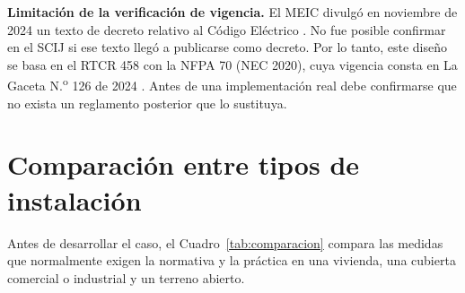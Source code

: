 \documentclass[12pt]{article}
\begin{document}
\textbf{Limitación de la verificación de vigencia.} El MEIC divulgó en noviembre de 2024 un texto de decreto relativo al Código Eléctrico \cite{meic2024}. No fue posible confirmar en el SCIJ si ese texto llegó a publicarse como decreto. Por lo tanto, este diseño se basa en el RTCR 458 con la NFPA 70 (NEC 2020), cuya vigencia consta en La Gaceta N.\textsuperscript{o} 126 de 2024 \cite{gacetaNEC}. Antes de una implementación real debe confirmarse que no exista un reglamento posterior que lo sustituya.

\section{Comparación entre tipos de instalación}
\label{sec:comparacion}
Antes de desarrollar el caso, el Cuadro~\ref{tab:comparacion} compara las medidas que normalmente exigen la normativa y la práctica en una vivienda, una cubierta comercial o industrial y un terreno abierto.
\end{document}
